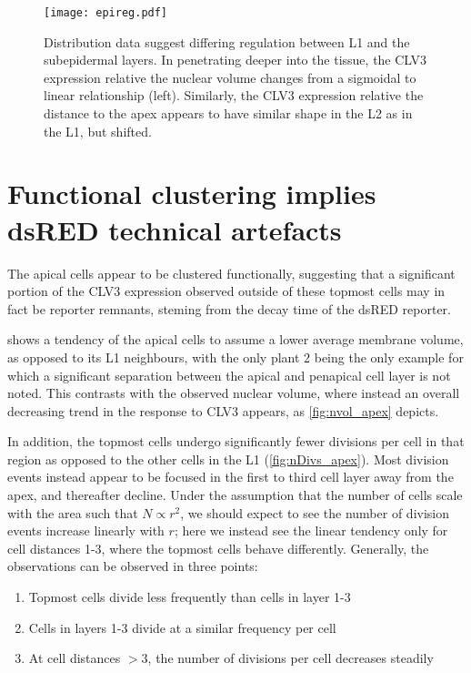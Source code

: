 \begin{figure}[H]
  \centering
  \texttt{[image: epireg.pdf]}
  \caption[Cues of epidermal regulation]{Distribution data suggest differing
    regulation between L1 and the subepidermal layers. In penetrating deeper
    into the tissue, the CLV3 expression relative the nuclear volume changes
    from a sigmoidal to linear relationship (left). Similarly, the CLV3
    expression relative the distance to the apex appears to have similar shape
    in the L2 as in the L1,
    but shifted.}
  \label{fig:epireg}
\end{figure}



 \section{Functional clustering implies dsRED technical artefacts}
 The apical cells appear to be clustered functionally, suggesting that a
 significant portion of the CLV3 expression observed outside of these topmost
 cells may in fact be reporter remnants, steming from the decay time of the
 dsRED reporter. 
 
  shows a tendency of the apical cells to
 assume a lower average membrane volume, as opposed to its L1 neighbours, with
 the only plant 2 being the only example for which a significant separation
 between the apical and penapical cell layer is not noted. This
 contrasts with the observed nuclear volume, where instead an overall decreasing
 trend in the response to CLV3 appears, as \cref{fig:nvol_apex} depicts.
 
 In addition, the topmost cells undergo significantly fewer divisions per cell in
 that region as opposed to the other cells in the L1 (\cref{fig:nDivs_apex}).
 Most division events instead appear to be focused in the first to third cell
 layer away from the apex, and thereafter decline. Under the assumption that the
 number of cells scale with the area such that $N \propto r^2$, we should expect
 to see the number of division events increase linearly with $r$; here we
 instead see the linear tendency only for cell distances 1-3, where the topmost cells
 behave differently. Generally, the observations can be observed in three
 points:
 \begin{enumerate}
   \item Topmost cells divide less frequently than cells in layer 1-3
   \item Cells in layers 1-3 divide at a similar frequency per cell
   \item At cell distances $>3$, the number of divisions per cell decreases
     steadily
 \end{enumerate}

